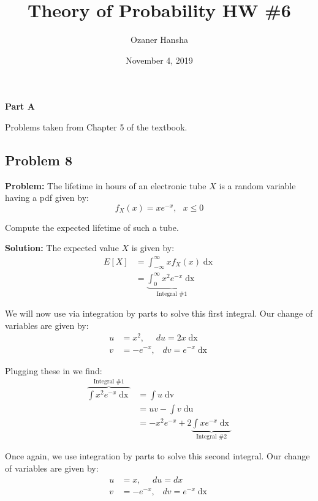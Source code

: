 \documentclass{article}
\begin{document}
\title{Theory of Probability HW \#6}
\author{Ozaner Hansha}
\date{November 4, 2019}
\maketitle

\begin{center}
    \Large{\textbf{Part A}}
\end{center}

Problems taken from Chapter 5 of the textbook.

\subsection*{Problem 8}
\noindent\textbf{Problem:} The lifetime in hours of an electronic tube $X$ is a random variable having a pdf given by:
\begin{equation*}
    f_X(x)=xe^{-x},\,\,\,\,x\le 0
\end{equation*}

Compute the expected lifetime of such a tube.
\bigskip

\noindent\textbf{Solution:} The expected value $X$ is given by:
\begin{align*}
    E[X]&=\int_{-\infty}^\infty xf_X(x)\mathop{dx}\tag{def. of expectation}\\
    &=\underbrace{\int_0^\infty x^2e^{-x}\mathop{dx}}_{\text{Integral \#1}}\tag{pdf of $X$}
\end{align*}

We will now use via integration by parts to solve this first integral. Our change of variables are given by:
\begin{align*}
    u&=x^2,\,\,\,\,\,\,\,\,du=2x\mathop{dx}\\
    v&=-e^{-x},\,\,\,\,\,dv=e^{-x}\mathop{dx}
\end{align*}

Plugging these in we find:
\begin{align*}
    \overbrace{\int x^2e^{-x}\mathop{dx}}^{\text{Integral \#1}}&=\int u\mathop{dv}\tag{change of variables}\\
    &=uv-\int v\mathop{du}\tag{integration by parts}\\
    &=-x^2e^{-x}+2\underbrace{\int xe^{-x}\mathop{dx}}_{\text{Integral \#2}}\tag{change of variables}
\end{align*}

Once again, we use integration by parts to solve this second integral. Our change of variables are given by:
\begin{align*}
    u&=x,\,\,\,\,\,\,\,\,du=dx\\
    v&=-e^{-x},\,\,\,\,\,dv=e^{-x}\mathop{dx}
\end{align*}
\end{document}
